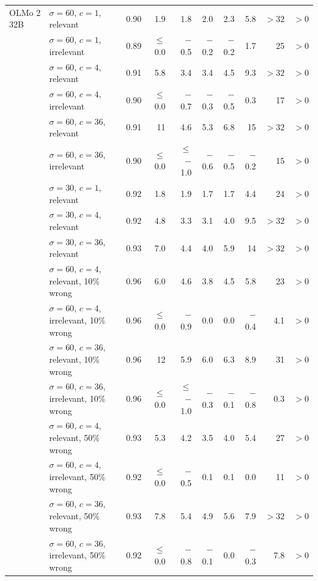 \begin{tabular}{llrrrrrrrr}
OLMo 2 32B & $\sigma = 60$, $c = 1$, relevant & 0.90 & 1.9 & 1.8 & 2.0 & 2.3 & 5.8 & $> 32$ & $> 0$ \\
 & $\sigma = 60$, $c = 1$, irrelevant & 0.89 & $\leq$ 0.0 & $-$0.5 & $-$0.2 & $-$0.2 & 1.7 & 25 & $> 0$ \\
 & $\sigma = 60$, $c = 4$, relevant & 0.91 & 5.8 & 3.4 & 3.4 & 4.5 & 9.3 & $> 32$ & $> 0$ \\
 & $\sigma = 60$, $c = 4$, irrelevant & 0.90 & $\leq$ 0.0 & $-$0.7 & $-$0.3 & $-$0.5 & 0.3 & 17 & $> 0$ \\
 & $\sigma = 60$, $c = 36$, relevant & 0.91 & 11 & 4.6 & 5.3 & 6.8 & 15 & $> 32$ & $> 0$ \\
 & $\sigma = 60$, $c = 36$, irrelevant & 0.90 & $\leq$ 0.0 & $\leq$ $-$1.0 & $-$0.6 & $-$0.5 & $-$0.2 & 15 & $> 0$ \\
 & $\sigma = 30$, $c = 1$, relevant & 0.92 & 1.8 & 1.9 & 1.7 & 1.7 & 4.4 & 24 & $> 0$ \\
 & $\sigma = 30$, $c = 4$, relevant & 0.92 & 4.8 & 3.3 & 3.1 & 4.0 & 9.5 & $> 32$ & $> 0$ \\
 & $\sigma = 30$, $c = 36$, relevant & 0.93 & 7.0 & 4.4 & 4.0 & 5.9 & 14 & $> 32$ & $> 0$ \\
 & $\sigma = 60$, $c = 4$, relevant, 10\% wrong & 0.96 & 6.0 & 4.6 & 3.8 & 4.5 & 5.8 & 23 & $> 0$ \\
 & $\sigma = 60$, $c = 4$, irrelevant, 10\% wrong & 0.96 & $\leq$ 0.0 & $-$0.9 & 0.0 & 0.0 & $-$0.4 & 4.1 & $> 0$ \\
 & $\sigma = 60$, $c = 36$, relevant, 10\% wrong & 0.96 & 12 & 5.9 & 6.0 & 6.3 & 8.9 & 31 & $> 0$ \\
 & $\sigma = 60$, $c = 36$, irrelevant, 10\% wrong & 0.96 & $\leq$ 0.0 & $\leq$ $-$1.0 & $-$0.3 & $-$0.1 & $-$0.8 & 0.3 & $> 0$ \\
 & $\sigma = 60$, $c = 4$, relevant, 50\% wrong & 0.93 & 5.3 & 4.2 & 3.5 & 4.0 & 5.4 & 27 & $> 0$ \\
 & $\sigma = 60$, $c = 4$, irrelevant, 50\% wrong & 0.92 & $\leq$ 0.0 & $-$0.5 & 0.1 & 0.1 & 0.0 & 11 & $> 0$ \\
 & $\sigma = 60$, $c = 36$, relevant, 50\% wrong & 0.93 & 7.8 & 5.4 & 4.9 & 5.6 & 7.9 & $> 32$ & $> 0$ \\
 & $\sigma = 60$, $c = 36$, irrelevant, 50\% wrong & 0.92 & $\leq$ 0.0 & $-$0.8 & $-$0.1 & 0.0 & $-$0.3 & 7.8 & $> 0$ \\
\bottomrule
\end{tabular}
